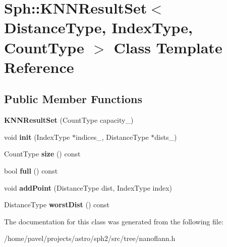 \hypertarget{classSph_1_1KNNResultSet}{}\section{Sph\+:\+:K\+N\+N\+Result\+Set$<$ Distance\+Type, Index\+Type, Count\+Type $>$ Class Template Reference}
\label{classSph_1_1KNNResultSet}
\subsection*{Public Member Functions}
\begin{DoxyCompactItemize}
\item 
\hypertarget{classSph_1_1KNNResultSet_a6ae179eab65d9be310ff80a9157f5e68}{}\label{classSph_1_1KNNResultSet_a6ae179eab65d9be310ff80a9157f5e68} 
{\bfseries K\+N\+N\+Result\+Set} (Count\+Type capacity\+\_\+)
\item 
\hypertarget{classSph_1_1KNNResultSet_a98d885efb9616640bd806b7cdb238846}{}\label{classSph_1_1KNNResultSet_a98d885efb9616640bd806b7cdb238846} 
void {\bfseries init} (Index\+Type $\ast$indices\+\_\+, Distance\+Type $\ast$dists\+\_\+)
\item 
\hypertarget{classSph_1_1KNNResultSet_a71008c4c8d17e64d6976ee852036c6de}{}\label{classSph_1_1KNNResultSet_a71008c4c8d17e64d6976ee852036c6de} 
Count\+Type {\bfseries size} () const
\item 
\hypertarget{classSph_1_1KNNResultSet_a026d995c0a228dbc1c322d8977fab5b0}{}\label{classSph_1_1KNNResultSet_a026d995c0a228dbc1c322d8977fab5b0} 
bool {\bfseries full} () const
\item 
\hypertarget{classSph_1_1KNNResultSet_a2ad6b553ca851a29ba007f6b2e4f1074}{}\label{classSph_1_1KNNResultSet_a2ad6b553ca851a29ba007f6b2e4f1074} 
void {\bfseries add\+Point} (Distance\+Type dist, Index\+Type index)
\item 
\hypertarget{classSph_1_1KNNResultSet_a99836c91ab02516ce91b45f49301adf5}{}\label{classSph_1_1KNNResultSet_a99836c91ab02516ce91b45f49301adf5} 
Distance\+Type {\bfseries worst\+Dist} () const
\end{DoxyCompactItemize}


The documentation for this class was generated from the following file\+:\begin{DoxyCompactItemize}
\item 
/home/pavel/projects/astro/sph2/src/tree/nanoflann.\+h\end{DoxyCompactItemize}
